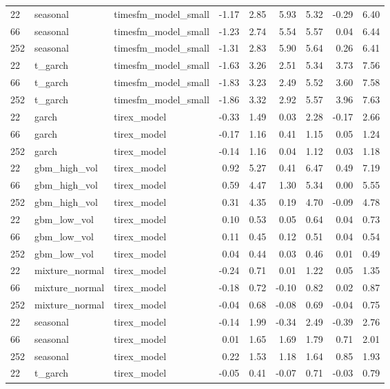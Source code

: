 {\begin{tabular}{lllrrrrrr}
\midrule
22 & seasonal & timesfm\_model\_small & -1.17 & 2.85 & 5.93 & 5.32 & -0.29 & 6.40 \\
66 & seasonal & timesfm\_model\_small & -1.23 & 2.74 & 5.54 & 5.57 & 0.04 & 6.44 \\
252 & seasonal & timesfm\_model\_small & -1.31 & 2.83 & 5.90 & 5.64 & 0.26 & 6.41 \\
\midrule
22 & t\_garch & timesfm\_model\_small & -1.63 & 3.26 & 2.51 & 5.34 & 3.73 & 7.56 \\
66 & t\_garch & timesfm\_model\_small & -1.83 & 3.23 & 2.49 & 5.52 & 3.60 & 7.58 \\
252 & t\_garch & timesfm\_model\_small & -1.86 & 3.32 & 2.92 & 5.57 & 3.96 & 7.63 \\
\midrule
22 & garch & tirex\_model & -0.33 & 1.49 & 0.03 & 2.28 & -0.17 & 2.66 \\
66 & garch & tirex\_model & -0.17 & 1.16 & 0.41 & 1.15 & 0.05 & 1.24 \\
252 & garch & tirex\_model & -0.14 & 1.16 & 0.04 & 1.12 & 0.03 & 1.18 \\
\midrule
22 & gbm\_high\_vol & tirex\_model & 0.92 & 5.27 & 0.41 & 6.47 & 0.49 & 7.19 \\
66 & gbm\_high\_vol & tirex\_model & 0.59 & 4.47 & 1.30 & 5.34 & 0.00 & 5.55 \\
252 & gbm\_high\_vol & tirex\_model & 0.31 & 4.35 & 0.19 & 4.70 & -0.09 & 4.78 \\
\midrule
22 & gbm\_low\_vol & tirex\_model & 0.10 & 0.53 & 0.05 & 0.64 & 0.04 & 0.73 \\
66 & gbm\_low\_vol & tirex\_model & 0.11 & 0.45 & 0.12 & 0.51 & 0.04 & 0.54 \\
252 & gbm\_low\_vol & tirex\_model & 0.04 & 0.44 & 0.03 & 0.46 & 0.01 & 0.49 \\
\midrule
22 & mixture\_normal & tirex\_model & -0.24 & 0.71 & 0.01 & 1.22 & 0.05 & 1.35 \\
66 & mixture\_normal & tirex\_model & -0.18 & 0.72 & -0.10 & 0.82 & 0.02 & 0.87 \\
252 & mixture\_normal & tirex\_model & -0.04 & 0.68 & -0.08 & 0.69 & -0.04 & 0.75 \\
\midrule
22 & seasonal & tirex\_model & -0.14 & 1.99 & -0.34 & 2.49 & -0.39 & 2.76 \\
66 & seasonal & tirex\_model & 0.01 & 1.65 & 1.69 & 1.79 & 0.71 & 2.01 \\
252 & seasonal & tirex\_model & 0.22 & 1.53 & 1.18 & 1.64 & 0.85 & 1.93 \\
\midrule
22 & t\_garch & tirex\_model & -0.05 & 0.41 & -0.07 & 0.71 & -0.03 & 0.79 \\

\end{tabular}}
